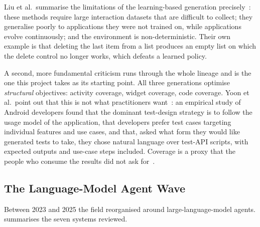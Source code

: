 Liu et al.\ summarise the limitations of the learning-based generation
precisely~\cite{gptdroid}: these methods require large interaction datasets
that are difficult to collect; they generalise poorly to applications they were
not trained on, while applications evolve continuously; and the environment is
non-deterministic. Their own example is that deleting the last item from a list
produces an empty list on which the delete control no longer works, which
defeats a learned policy.

A second, more fundamental criticism runs through the whole lineage and is the
one this project takes as its starting point. All three generations optimise
\emph{structural} objectives: activity coverage, widget coverage, code coverage.
Yoon et al.\ point out that this is not what practitioners
want~\cite{droidagent}: an empirical study of Android developers found that the
dominant test-design strategy is to follow the usage model of the application,
that developers prefer test cases targeting individual features and use cases,
and that, asked what form they would like generated tests to take, they chose
natural language over test-API scripts, with expected outputs and use-case
steps included. Coverage is a proxy that the people who consume the results did
not ask for~\cite{coppola}.

\subsection{The Language-Model Agent Wave}
\label{subsec:llmwave}

Between 2023 and 2025 the field reorganised around large-language-model agents.
 summarises the seven systems reviewed.

